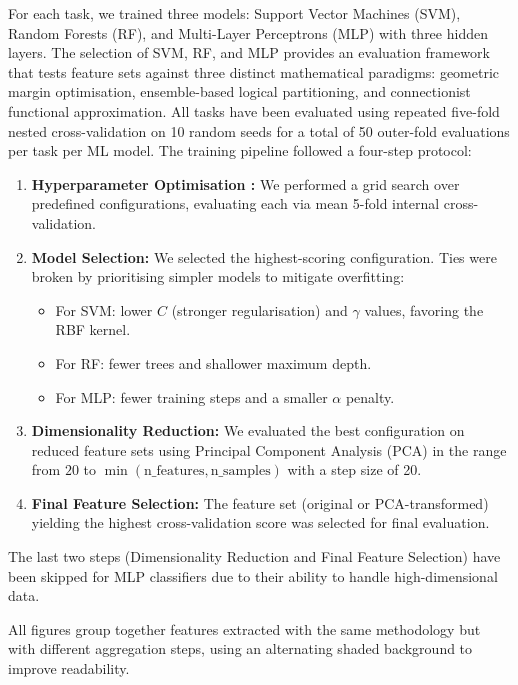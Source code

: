 For each task, we trained three models: Support Vector Machines (SVM), Random Forests (RF), and Multi-Layer Perceptrons (MLP) with three hidden layers. The selection of SVM, RF, and MLP provides an evaluation framework that tests feature sets against three distinct mathematical paradigms: geometric margin optimisation, ensemble-based logical partitioning, and connectionist functional approximation. All tasks have been evaluated using repeated five-fold nested cross-validation on 10 random seeds for a total of 50 outer-fold evaluations per task per ML model. The training pipeline followed a four-step protocol:
\begin{enumerate}
  \item \textbf{Hyperparameter Optimisation :} We performed a grid search over predefined configurations, evaluating each via mean 5-fold internal cross-validation.
  \item \textbf{Model Selection:} We selected the highest-scoring configuration. Ties were broken by prioritising simpler models to mitigate overfitting:
    \begin{itemize}
      \item For SVM: lower $C$ (stronger regularisation) and $\gamma$ values, favoring the RBF kernel.
      \item For RF: fewer trees and shallower maximum depth.
      \item For MLP: fewer training steps and a smaller $\alpha$ penalty.
    \end{itemize}
  \item \textbf{Dimensionality Reduction:} We evaluated the best configuration on reduced feature sets using Principal Component Analysis (PCA) in the range from $20$ to $\min(\text{n\_features}, \text{n\_samples})$ with a step size of 20.
      \item \textbf{Final Feature Selection:} The feature set (original or PCA-transformed) yielding the highest cross-validation score was selected for final evaluation.
    \end{enumerate}

    The last two steps (Dimensionality Reduction and Final Feature Selection) have been skipped for MLP classifiers due to their ability to handle high-dimensional data.

    All figures group together features extracted with the same methodology but with different aggregation steps, using an alternating shaded background to improve readability.


